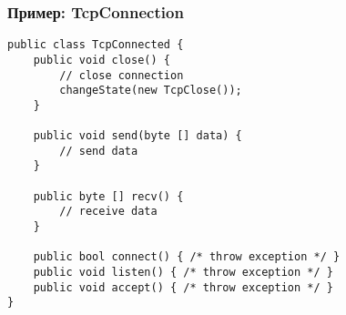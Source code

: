 \documentclass[handout]{beamer}
\begin{document}
\begin{frame}[fragile]
\frametitle{Пример: TcpConnection}
\begin{lstlisting}
public class TcpConnected {  
    public void close() {
        // close connection
        changeState(new TcpClose());
    }
    
    public void send(byte [] data) {
        // send data
    }

    public byte [] recv() {
        // receive data
    }
    
    public bool connect() { /* throw exception */ }
    public void listen() { /* throw exception */ }
    public void accept() { /* throw exception */ }
}
\end{lstlisting}
\end{frame}
\end{document}
